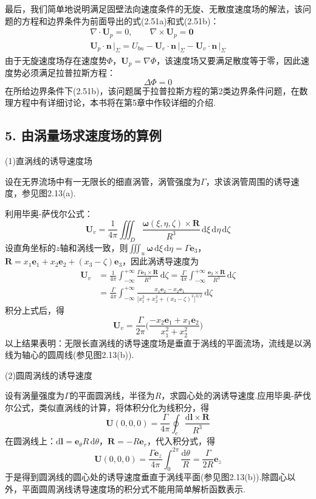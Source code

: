 最后，我们简单地说明满足固壁法向速度条件的无旋、无散度速度场的解法，该问题的方程和边界条件为前面导出的式(2.51a)和式(2.51b)：
\begin{gather*}
\nabla\cdot\boldsymbol{U}_p=0,\qquad \nabla\times\boldsymbol{U}_p=\boldsymbol{0}\\[2pt]
\boldsymbol{U}_p\cdot\boldsymbol{n}\,\big|_{\Sigma}=U_{bn}-\boldsymbol{U}_e\cdot\boldsymbol{n}\,\big|_{\Sigma}-\boldsymbol{U}_v\cdot\boldsymbol{n}\,\big|_{\Sigma}
\end{gather*}
由于无旋速度场存在速度势$\Phi$，$\boldsymbol{U}_p=\nabla\Phi$，该速度场又要满足散度等于零，因此速度势必须满足拉普拉斯方程：
\[
\Delta\Phi=0
\]
在所给边界条件下(2.51b)，该问题属于拉普拉斯方程的第2类边界条件问题，在数理方程中有详细讨论，本书将在第5章中作较详细的介绍.

\subsection*{5. 由涡量场求速度场的算例}

(1)直涡线的诱导速度场

设在无界流场中有一无限长的细直涡管，涡管强度为$\Gamma$，求该涡管周围的诱导速度，参见图2.13(a).

利用毕奥-萨伐尔公式：
\[
\boldsymbol{U}_v=\frac{1}{4\pi}\iiint_D \frac{\boldsymbol{\omega}(\xi,\eta,\zeta)\times\boldsymbol{R}}{R^{3}}\,\mathrm{d}\xi\,\mathrm{d}\eta\,\mathrm{d}\zeta
\]
设直角坐标的$z$轴和涡线一致，则$\displaystyle\iiint_u \boldsymbol{\omega}\,\mathrm{d}\xi\,\mathrm{d}\eta=\Gamma\boldsymbol{e}_3$，$\boldsymbol{R}=x_1\boldsymbol{e}_1+x_2\boldsymbol{e}_2+(x_3-\zeta)\boldsymbol{e}_3$，因此涡诱导速度为
\begin{align*}
\boldsymbol{U}_v&=\frac{1}{4\pi}\int_{-\infty}^{+\infty} \frac{\Gamma\boldsymbol{e}_3\times\boldsymbol{R}}{R^{3}}\,\mathrm{d}\zeta=\frac{\Gamma}{4\pi}\int_{-\infty}^{+\infty} \frac{\boldsymbol{e}_3\times\boldsymbol{R}}{R^{3}}\,\mathrm{d}\zeta\\
&=\frac{\Gamma}{4\pi}\int_{-\infty}^{+\infty} \frac{x_1\boldsymbol{e}_2-x_2\boldsymbol{e}_1}{\big[x_1^{2}+x_2^{2}+(x_3-\zeta)^{2}\big]^{3/2}}\,\mathrm{d}\zeta
\end{align*}
积分上式后，得
\[
\boldsymbol{U}_v=\frac{\Gamma}{2\pi}\bigg(\frac{-x_2\boldsymbol{e}_1+x_1\boldsymbol{e}_2}{x_1^{2}+x_2^{2}}\bigg)
\]
以上结果表明：无限长直涡线的诱导速度场是垂直于涡线的平面流场，流线是以涡线为轴心的圆周线(参见图2.13(b)).

(2)圆周涡线的诱导速度

设有涡量强度为$\Gamma$的平面圆涡线，半径为$R$，求圆心处的涡诱导速度.应用毕奥-萨伐尔公式，类似直涡线的计算，将体积分化为线积分，得
\[
\boldsymbol{U}(0,0,0)=\frac{\Gamma}{4\pi}\oint_c \frac{\mathrm{d}\boldsymbol{l}\times\boldsymbol{R}}{R^{3}}
\]
在圆涡线上：$\mathrm{d}\boldsymbol{l}=\boldsymbol{e}_\theta R\,\mathrm{d}\theta$，$\boldsymbol{R}=-R\boldsymbol{e}_r$，代入积分式，得
\[
\boldsymbol{U}(0,0,0)=\frac{\Gamma\boldsymbol{e}_z}{4\pi}\int_0^{2\pi}\frac{\mathrm{d}\theta}{R}=\frac{\Gamma}{2R}\boldsymbol{e}_z
\]
于是得到圆涡线的圆心处的诱导速度垂直于涡线平面(参见图2.13(b)).除圆心以外，平面圆周涡线诱导速度场的积分式不能用简单解析函数表示.

